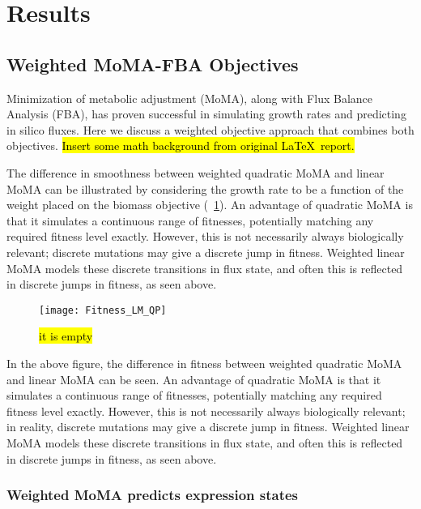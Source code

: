 \section{Results}

\subsection{Weighted MoMA-FBA Objectives}

Minimization of metabolic adjustment (MoMA), along with Flux Balance
Analysis (FBA), has proven successful in simulating growth rates and
predicting in silico fluxes. Here we discuss a weighted objective
approach that combines both objectives. \hl{Insert some math background
from original \LaTeX~report.} 

The difference in smoothness between weighted quadratic MoMA and linear
MoMA can be illustrated by considering the growth rate to be a
function of the weight placed on the biomass objective (\Fig~\ref{fig:Fitness_LM_QP}).  An
advantage of quadratic MoMA is that it simulates a continuous range of
fitnesses, potentially matching any required fitness level exactly.
However, this is not necessarily always biologically relevant;
discrete mutations may give a discrete jump in fitness. Weighted
linear MoMA models these discrete transitions in flux state, and often
this is reflected in discrete jumps in fitness, as seen above.

\begin{figure}
\centering
  \texttt{[image: Fitness\_LM\_QP]}
  \caption{\hl{it is empty}}
  \label{fig:Fitness_LM_QP}
\end{figure}

In the above figure, the difference in fitness between weighted
quadratic MoMA and linear MoMA can be seen. An advantage of quadratic
MoMA is that it simulates a continuous range of fitnesses, potentially
matching any required fitness level exactly.  However, this is not
necessarily always biologically relevant; in reality, discrete mutations may give
a discrete jump in fitness. Weighted linear MoMA models these discrete
transitions in flux state, and often this is reflected in discrete
jumps in fitness, as seen above.

\subsubsection{Weighted MoMA predicts expression states}

